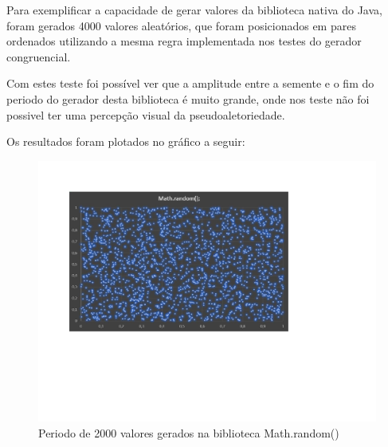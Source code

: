 Para exemplificar a capacidade de gerar valores da biblioteca nativa do Java, foram gerados 4000 valores aleatórios, que foram posicionados em pares ordenados utilizando a mesma regra implementada nos testes do gerador congruencial.

Com estes teste foi possível ver que a amplitude entre a semente e o fim do periodo do gerador desta biblioteca é muito grande, onde nos teste não foi possivel ter uma percepção visual da pseudoaletoriedade.

Os resultados foram plotados no gráfico a seguir:

\begin{figure}[ht]
    \includegraphics[scale=0.73]{JoseGeraldo-lista2/fig/fig5.pdf}
    \caption{Periodo de 2000 valores gerados na biblioteca Math.random()}

\end{figure}

